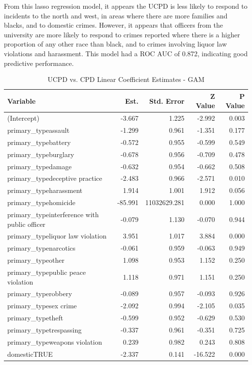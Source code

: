 \documentclass{ucetd}
\begin{document}
From this lasso regression model, it appears the UCPD is less likely to
respond to incidents to the north and west, in areas where there are
more families and blacks, and to domestic crimes. However, it appears
that officers from the university are more likely to respond to crimes
reported where there is a higher proportion of any other race than
black, and to crimes involving liquor law violations and harassment.
This model had a ROC AUC of 0.872, indicating good predictive
performance.

\begin{table}

\caption{\label{tab:ucpd-gam}UCPD vs. CPD Linear Coefficient Estimates - GAM}
\centering
\begin{tabular}[t]{l|r|r|r|r}
\hline
Variable & Est. & Std. Error & Z Value & P Value\\
\hline
(Intercept) & -3.667 & 1.225 & -2.992 & 0.003\\
\hline
primary\_typeassault & -1.299 & 0.961 & -1.351 & 0.177\\
\hline
primary\_typebattery & -0.572 & 0.955 & -0.599 & 0.549\\
\hline
primary\_typeburglary & -0.678 & 0.956 & -0.709 & 0.478\\
\hline
primary\_typedamage & -0.632 & 0.954 & -0.662 & 0.508\\
\hline
primary\_typedeceptive practice & -2.483 & 0.966 & -2.571 & 0.010\\
\hline
primary\_typeharassment & 1.914 & 1.001 & 1.912 & 0.056\\
\hline
primary\_typehomicide & -85.991 & 11032629.281 & 0.000 & 1.000\\
\hline
primary\_typeinterference with public officer & -0.079 & 1.130 & -0.070 & 0.944\\
\hline
primary\_typeliquor law violation & 3.951 & 1.017 & 3.884 & 0.000\\
\hline
primary\_typenarcotics & -0.061 & 0.959 & -0.063 & 0.949\\
\hline
primary\_typeother & 1.098 & 0.953 & 1.152 & 0.250\\
\hline
primary\_typepublic peace violation & 1.118 & 0.971 & 1.151 & 0.250\\
\hline
primary\_typerobbery & -0.089 & 0.957 & -0.093 & 0.926\\
\hline
primary\_typesex crime & -2.092 & 0.994 & -2.105 & 0.035\\
\hline
primary\_typetheft & -0.599 & 0.952 & -0.629 & 0.530\\
\hline
primary\_typetrespassing & -0.337 & 0.961 & -0.351 & 0.725\\
\hline
primary\_typeweapons violation & 0.239 & 0.982 & 0.243 & 0.808\\
\hline
domesticTRUE & -2.337 & 0.141 & -16.522 & 0.000\\
\hline
\end{tabular}
\end{table}
\end{document}
